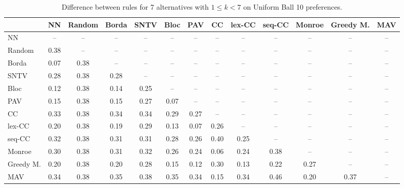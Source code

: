 
\begin{table*}[htbp]
\centering
\begin{tabular}{lcccccccccccc}
\toprule
 & NN & Random & Borda & SNTV & Bloc & PAV & CC & lex-CC & seq-CC & Monroe & Greedy M. & MAV \\
\midrule
NN & -- & -- & -- & -- & -- & -- & -- & -- & -- & -- & -- & -- \\
Random & \cellcolor{blue!38} 0.38 & -- & -- & -- & -- & -- & -- & -- & -- & -- & -- & -- \\
Borda & \cellcolor{blue!7} 0.07 & \cellcolor{blue!38} 0.38 & -- & -- & -- & -- & -- & -- & -- & -- & -- & -- \\
SNTV & \cellcolor{blue!28} 0.28 & \cellcolor{blue!38} 0.38 & \cellcolor{blue!28} 0.28 & -- & -- & -- & -- & -- & -- & -- & -- & -- \\
Bloc & \cellcolor{blue!12} 0.12 & \cellcolor{blue!38} 0.38 & \cellcolor{blue!14} 0.14 & \cellcolor{blue!25} 0.25 & -- & -- & -- & -- & -- & -- & -- & -- \\
PAV & \cellcolor{blue!15} 0.15 & \cellcolor{blue!38} 0.38 & \cellcolor{blue!15} 0.15 & \cellcolor{blue!27} 0.27 & \cellcolor{blue!7} 0.07 & -- & -- & -- & -- & -- & -- & -- \\
CC & \cellcolor{blue!33} 0.33 & \cellcolor{blue!38} 0.38 & \cellcolor{blue!34} 0.34 & \cellcolor{blue!34} 0.34 & \cellcolor{blue!28} 0.29 & \cellcolor{blue!27} 0.27 & -- & -- & -- & -- & -- & -- \\
lex-CC & \cellcolor{blue!20} 0.20 & \cellcolor{blue!38} 0.38 & \cellcolor{blue!19} 0.19 & \cellcolor{blue!28} 0.29 & \cellcolor{blue!13} 0.13 & \cellcolor{blue!7} 0.07 & \cellcolor{blue!26} 0.26 & -- & -- & -- & -- & -- \\
seq-CC & \cellcolor{blue!32} 0.32 & \cellcolor{blue!38} 0.38 & \cellcolor{blue!31} 0.31 & \cellcolor{blue!31} 0.31 & \cellcolor{blue!28} 0.28 & \cellcolor{blue!26} 0.26 & \cellcolor{blue!40} 0.40 & \cellcolor{blue!25} 0.25 & -- & -- & -- & -- \\
Monroe & \cellcolor{blue!30} 0.30 & \cellcolor{blue!38} 0.38 & \cellcolor{blue!31} 0.31 & \cellcolor{blue!32} 0.32 & \cellcolor{blue!26} 0.26 & \cellcolor{blue!24} 0.24 & \cellcolor{blue!6} 0.06 & \cellcolor{blue!24} 0.24 & \cellcolor{blue!38} 0.38 & -- & -- & -- \\
Greedy M. & \cellcolor{blue!20} 0.20 & \cellcolor{blue!38} 0.38 & \cellcolor{blue!20} 0.20 & \cellcolor{blue!28} 0.28 & \cellcolor{blue!15} 0.15 & \cellcolor{blue!12} 0.12 & \cellcolor{blue!30} 0.30 & \cellcolor{blue!13} 0.13 & \cellcolor{blue!22} 0.22 & \cellcolor{blue!27} 0.27 & -- & -- \\
MAV & \cellcolor{blue!34} 0.34 & \cellcolor{blue!38} 0.38 & \cellcolor{blue!35} 0.35 & \cellcolor{blue!38} 0.38 & \cellcolor{blue!35} 0.35 & \cellcolor{blue!34} 0.34 & \cellcolor{blue!15} 0.15 & \cellcolor{blue!34} 0.34 & \cellcolor{blue!46} 0.46 & \cellcolor{blue!20} 0.20 & \cellcolor{blue!37} 0.37 & -- \\
\bottomrule
\end{tabular}

\caption{Difference between rules for 7 alternatives with $1 \leq k < 7$ on Uniform Ball 10 preferences.}
\label{tab:rule_distance_heatmap-m=[7]-pref_dist=euclidean__args__dimensions=10_-_space=uniform_ball}
\end{table*}
    